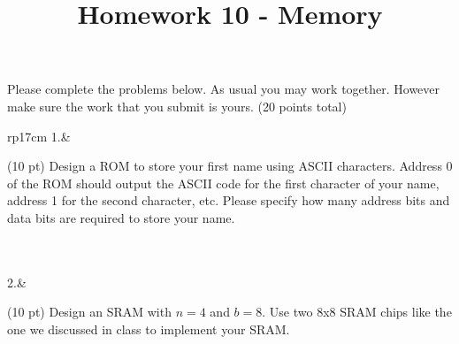\documentclass{article}
\title{Homework 10 - Memory}
\date{}
\begin{document}
\maketitle
Please complete the problems below.  As usual you may work together.  However make sure the work that you submit is yours. (20 points total)
\begin{longtable}[l]{rp{17cm}}
1.&\begin{minipage}[t]{\linewidth}(10 pt) Design a ROM to store your first name using ASCII characters.  Address 0 of the ROM should output the ASCII code for the first character of your name, address 1 for the second character, etc.  Please specify how many address bits and data bits are required to store your name.\\ \\

\vspace{12cm
}
\end{minipage}\\
\medskip
2.&\begin{minipage}[t]{\linewidth}(10 pt) Design an SRAM with $n=4$ and $b=8$.  Use two 8x8 SRAM chips like the one we discussed in class to implement your SRAM.

\vspace{12cm
}
\end{minipage}\\
\medskip
\end{longtable}
\end{document}
